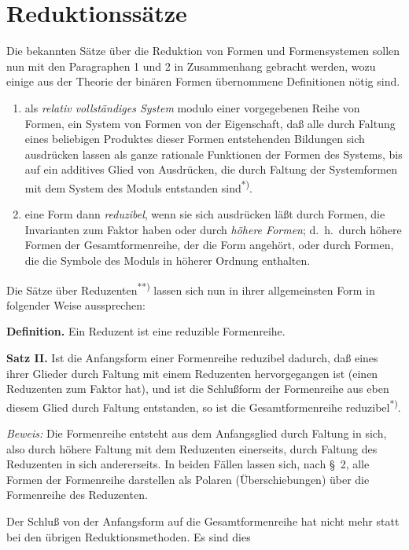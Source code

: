 \documentclass[12pt,a4paper]{article}
\begin{document}
\section{Reduktionssätze}

Die bekannten Sätze über die Reduktion von Formen und Formensystemen sollen nun mit den Paragraphen 1 und 2 in Zusammenhang gebracht werden, wozu einige aus der Theorie der binären Formen übernommene Definitionen nötig sind.

\begin{enumerate}
\item[Wir bezeichnen] als \textit{relativ vollständiges System} modulo einer vorgegebenen Reihe von Formen, ein System von Formen von der Eigenschaft, daß alle durch Faltung eines beliebigen Produktes dieser Formen entstehenden Bildungen sich ausdrücken lassen als ganze rationale Funktionen der Formen des Systems, bis auf ein additives Glied von Ausdrücken, die durch Faltung der Systemformen mit dem System des Moduls entstanden sind\textsuperscript{*)}.

\item[Wir nennen] eine Form dann \textit{reduzibel}, wenn sie sich ausdrücken läßt durch Formen, die Invarianten zum Faktor haben oder durch \textit{höhere Formen}; d.\ h.\ durch höhere Formen der Gesamtformenreihe, der die Form angehört, oder durch Formen, die die Symbole des Moduls in höherer Ordnung enthalten.
\end{enumerate}

Die Sätze über Reduzenten\textsuperscript{**)} lassen sich nun in ihrer allgemeinsten Form in folgender Weise aussprechen:

\textbf{Definition.} Ein Reduzent ist eine reduzible Formenreihe.

\textbf{Satz II.} Ist die Anfangsform einer Formenreihe reduzibel dadurch, daß eines ihrer Glieder durch Faltung mit einem Reduzenten hervorgegangen ist (einen Reduzenten zum Faktor hat), und ist die Schlußform der Formenreihe aus eben diesem Glied durch Faltung entstanden, so ist die Gesamtformenreihe reduzibel\textsuperscript{*)}.

\textit{Beweis:} Die Formenreihe entsteht aus dem Anfangsglied durch Faltung in sich, also durch höhere Faltung mit dem Reduzenten einerseits, durch Faltung des Reduzenten in sich andererseits. In beiden Fällen lassen sich, nach \S\ 2, alle Formen der Formenreihe darstellen als Polaren (Überschiebungen) über die Formenreihe des Reduzenten.

Der Schluß von der Anfangsform auf die Gesamtformenreihe hat nicht mehr statt bei den übrigen Reduktionsmethoden. Es sind dies
\end{document}
